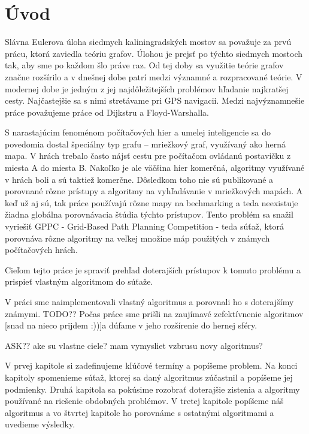 \chapter*{Úvod}

Slávna Eulerova úloha siedmych kaliningradských mostov sa považuje za prvú prácu, 
ktorá zaviedla teóriu grafov. Úlohou je prejsť po týchto siedmych mostoch tak, aby sme po každom šlo práve raz.
Od tej doby sa využitie teórie grafov značne
rozšírilo a v dnešnej dobe patrí medzi významné
a rozpracované teórie. V modernej dobe je jedným z jej 
najdôležitejších problémov hľadanie najkratšej cesty. Najčastejšie sa s nimi stretávame pri 
GPS navigacii.
Medzi najvýznamnešie práce považujeme práce od Dijkstru a Floyd-Warshalla.

S narastajúcim fenoménom počítačových hier 
a umelej inteligencie sa do povedomia dostal špeciálny typ grafu --
mriežkový graf, využívaný ako herná mapa.
V hrách trebalo často nájsť cestu pre počítačom
ovládanú postavičku z miesta A do miesta B.
Nakoľko je ale väčšina hier komerčná, algoritmy
využívané v hrách boli a sú taktiež komerčne.
Dôsledkom toho nie sú publikované a porovnané rôzne prístupy a algoritmy
na vyhľadávanie v mriežkových mapách. A keď už aj sú, tak práce používajú rôzne mapy
na bechmarking a teda neexistuje žiadna globálna porovnávacia štúdia týchto prístupov.
Tento problém sa snažil vyriešiť GPPC - Grid-Based Path Planning Competition - teda súťaž, ktorá porovnáva rôzne algoritmy na veľkej množine máp
použitých v známych počítačových hrách.

Cieľom tejto práce je spraviť prehľad doterajších prístupov k tomuto problému a prispieť vlastným algoritmom
do súťaže.




V práci sme naimplementovali vlastný algoritmus a porovnali ho s doterajšímy známymi.
TODO?? Počas práce sme prišli na zaujímavé zefektívnenie algoritmov [snad na nieco prijdem :))]a dúfame v jeho rozšírenie do hernej sféry.

ASK?? ake su vlastne ciele? mam vymysliet vzbrusu novy algoritmus?

V prvej kapitole si zadefinujeme kľúčové termíny a popíšeme problem. Na konci kapitoly spomenieme súťaž, ktorej sa daný algoritmus zúčastnil 
a popíšeme jej podmienky.
Druhá kapitola sa pokúsime rozobrať doterajšie zistenia a algoritmy používané na riešenie obdobných problémov.
V tretej kapitole popíšeme náš algoritmus a vo štvrtej kapitole ho porovnáme s ostatnými algoritmami a uvedieme výsledky.
